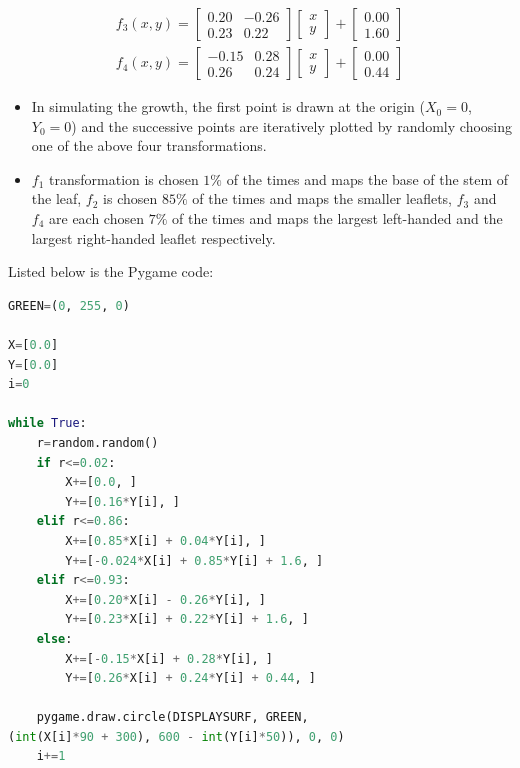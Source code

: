 \documentclass{article}
\begin{document}
\begin{gather}
f_3(x, y)=\begin{bmatrix}0.20 & -0.26 \\ 0.23 & 0.22 \end{bmatrix}\begin{bmatrix}x\\y\end{bmatrix} + \begin{bmatrix}0.00\\1.60\end{bmatrix}
\end{gather}
\begin{gather}
f_4(x, y)=\begin{bmatrix}-0.15 & 0.28 \\ 0.26 & 0.24 \end{bmatrix}\begin{bmatrix}x\\y\end{bmatrix} + \begin{bmatrix}0.00\\0.44\end{bmatrix}
\end{gather}

\begin{itemize}
\item In simulating the growth, the first point is drawn at the origin ($X_0=0$, $Y_0=0$) and the successive points are iteratively plotted by randomly choosing one of the above four transformations.
\item $f_1$ transformation is chosen $1\%$ of the times and maps the base of the stem of the leaf, $f_2$ is chosen $85\%$ of the times and maps the smaller leaflets, $f_3$ and $f_4$ are each chosen $7\%$ of the times and maps the largest left-handed and the largest right-handed leaflet respectively.
\end{itemize}
Listed below is the Pygame code:
\begin{lstlisting}[language=Python, frame=single]
GREEN=(0, 255, 0)

X=[0.0]
Y=[0.0]
i=0

while True:
    r=random.random() 
    if r<=0.02:
        X+=[0.0, ]
        Y+=[0.16*Y[i], ]
    elif r<=0.86:
        X+=[0.85*X[i] + 0.04*Y[i], ]
        Y+=[-0.024*X[i] + 0.85*Y[i] + 1.6, ]
    elif r<=0.93:
        X+=[0.20*X[i] - 0.26*Y[i], ]
        Y+=[0.23*X[i] + 0.22*Y[i] + 1.6, ]
    else:
        X+=[-0.15*X[i] + 0.28*Y[i], ]
        Y+=[0.26*X[i] + 0.24*Y[i] + 0.44, ]

    pygame.draw.circle(DISPLAYSURF, GREEN, 
(int(X[i]*90 + 300), 600 - int(Y[i]*50)), 0, 0) 
    i+=1
\end{lstlisting}
\end{document}

